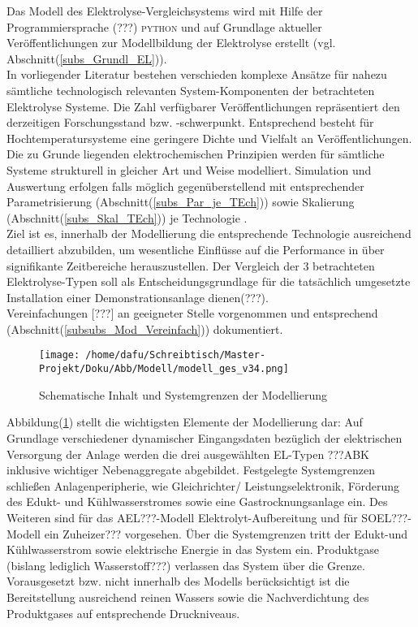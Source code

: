\documentclass[onecolumn,10pt,titlepage]{article}
\begin{document}
Das Modell des Elektrolyse-Vergleichsystems wird mit Hilfe der Programmiersprache (???) \textsc{python} und auf Grundlage aktueller Veröffentlichungen zur Modellbildung der Elektrolyse erstellt (vgl. Abschnitt(\ref{subs_Grundl_EL})).\\
In vorliegender Literatur bestehen verschieden komplexe Ansätze für nahezu sämtliche technologisch relevanten System-Komponenten der betrachteten Elektrolyse Systeme. Die Zahl verfügbarer Veröffentlichungen repräsentiert den derzeitigen Forschungsstand bzw. -schwerpunkt. Entsprechend besteht für Hochtemperatursysteme eine geringere Dichte und Vielfalt an Veröffentlichungen.\\
Die zu Grunde liegenden elektrochemischen Prinzipien werden für sämtliche Systeme strukturell in gleicher Art und Weise modelliert. Simulation und Auswertung erfolgen falls möglich gegenüberstellend mit entsprechender Parametrisierung (Abschnitt(\ref{subs_Par_je_TEch})) sowie Skalierung (Abschnitt(\ref{subs_Skal_TEch})) je Technologie .\\
Ziel ist es, innerhalb der Modellierung die entsprechende Technologie ausreichend detailliert abzubilden, um wesentliche Einflüsse auf die Performance in über signifikante Zeitbereiche %
herauszustellen. Der Vergleich der 3 betrachteten Elektrolyse-Typen soll als Entscheidungsgrundlage für die tatsächlich umgesetzte Installation einer Demonstrationsanlage dienen(???).\\
Vereinfachungen [???] an geeigneter Stelle vorgenommen und entsprechend (Abschnitt(\ref{subsubs_Mod_Vereinfach})) dokumentiert.
\begin{figure}[H]
	
	\centering
	\texttt{[image: /home/dafu/Schreibtisch/Master-Projekt/Doku/Abb/Modell/modell\_ges\_v34.png]}
	\caption{Schematische Inhalt und Systemgrenzen der Modellierung}
	\label{fig:Mod_Zielsetz} 
\end{figure}
Abbildung(\ref{fig:Mod_Zielsetz}) stellt die wichtigsten Elemente der Modellierung dar:
Auf Grundlage verschiedener dynamischer Eingangsdaten bezüglich der elektrischen Versorgung der Anlage werden die drei ausgewählten EL-Typen ???ABK inklusive wichtiger Nebenaggregate abgebildet. Festgelegte Systemgrenzen schließen Anlagenperipherie, wie Gleichrichter/ Leistungselektronik, Förderung des Edukt- und Kühlwasserstromes sowie eine Gastrocknungsanlage ein. Des Weiteren sind für das AEL???-Modell Elektrolyt-Aufbereitung und für SOEL???-Modell ein Zuheizer??? vorgesehen. Über die Systemgrenzen tritt der Edukt-und Kühlwasserstrom sowie elektrische Energie in das System ein. Produktgase (bislang lediglich Wasserstoff???) verlassen das System über die Grenze. Vorausgesetzt bzw. nicht innerhalb des Modells berücksichtigt ist die Bereitstellung ausreichend reinen Wassers sowie die Nachverdichtung des Produktgases auf entsprechende Druckniveaus.
\end{document}
